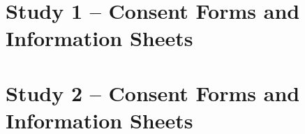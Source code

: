 \documentclass[11pt, oneside, a4paper]{book}
\begin{document}
\chapter{Study 1 -- Consent Forms and Information Sheets} \label{apx:Exp1:InformedConsentForms}



\chapter{Study 2 -- Consent Forms and Information Sheets} \label{apx:Exp2:InformedConsentForms}


%

%
\end{document}
